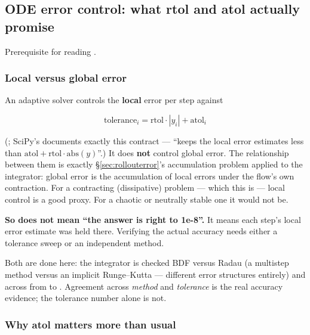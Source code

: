 \subsection{ODE error control: what rtol and atol actually promise}
\label{sec:errorcontrol}

Prerequisite for reading .

\subsubsection{Local versus global error}
\label{sec:localglobal}

An adaptive solver controls the \textbf{local} error per step against

\begin{equation}
\text{tolerance}_i = \mathrm{rtol}\cdot|y_i| + \mathrm{atol}_i
\label{eq:error-tolerance}
\end{equation}

(\citealt{hairer1993}; SciPy's  documents exactly this contract
--- ``keeps the local error estimates less than
$\mathrm{atol} + \mathrm{rtol}\cdot\mathrm{abs}(y)$''.) It does \textbf{not}
control global error. The relationship between them is exactly
\S\ref{sec:rollouterror}'s accumulation problem applied to the integrator:
global error is the accumulation of local errors under the flow's own
contraction. For a contracting (dissipative) problem --- which this is --- local
control is a good proxy. For a chaotic or neutrally stable one it would not be.

\textbf{So  does not mean ``the answer is right to 1e-8''.} It
means each step's local error estimate was held there. Verifying the actual
accuracy needs either a tolerance sweep or an independent method.

Both are done here: the integrator is checked BDF versus Radau (a multistep
method versus an implicit Runge--Kutta --- different error structures entirely)
and across  from  to . Agreement across
\emph{method} and \emph{tolerance} is the real accuracy evidence; the tolerance
number alone is not.

\subsubsection{Why atol matters more than usual}
\label{sec:atol}

